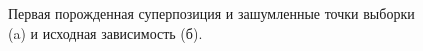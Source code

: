 \documentclass[12pt,a4paper]{article}
\begin{document}
\begin{figure}[h]
  \centering
  \caption{Первая порожденная суперпозиция и зашумленные точки выборки (a) и исходная зависимость (б).}
  \label{fig:1_results}
\end{figure}
\end{document}
